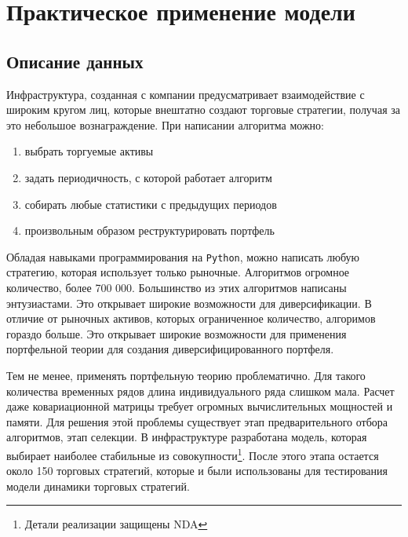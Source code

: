 \chapter{Практическое применение модели}
\section{Описание данных}
Инфраструктура, созданная с компании предусматривает взаимодействие с широким кругом лиц, которые внештатно создают торговые стратегии, получая за это небольшое вознаграждение. При написании алгоритма можно:
\begin{enumerate}
	\item выбрать торгуемые активы
	\item задать периодичность, с которой работает алгоритм
	\item собирать любые статистики с предыдущих периодов
	\item произвольным образом реструктурировать портфель
\end{enumerate}
Обладая навыками программирования на \texttt{Python}, можно написать любую стратегию, которая использует только рыночные. Алгоритмов огромное количество, более 700 000. Большинство из этих алгоритмов написаны энтузиастами. Это открывает широкие возможности для диверсификации. В отличие от рыночных активов, которых ограниченное количество, алгоримов гораздо больше. Это открывает широкие возможности для применения портфельной теории для создания диверсифицированного портфеля.

Тем не менее, применять портфельную теорию проблематично. Для такого количества временных рядов длина индивидуального ряда слишком мала. Расчет даже ковариационной матрицы требует огромных вычислительных мощностей и памяти. Для решения этой проблемы существует этап предварительного отбора алгоритмов, этап селекции. В инфраструктуре разработана модель, которая выбирает наиболее стабильные из совокупности\footnote{Детали реализации защищены NDA}. После этого этапа остается около 150 торговых стратегий, которые и были использованы для тестирования модели динамики торговых стратегий.

